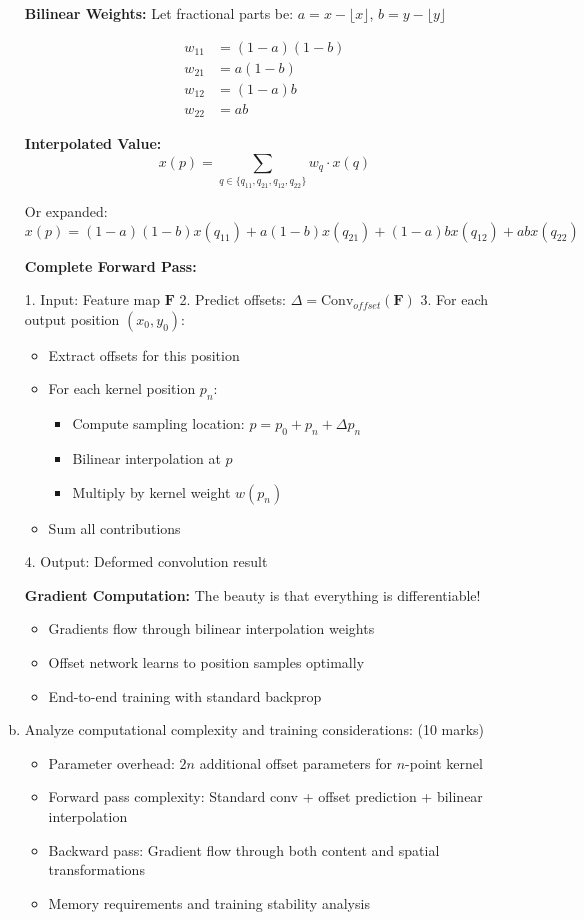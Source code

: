 \documentclass[12pt]{article}
\newcommand{\explanation}[1]{{\color{explanationcolor}#1}}
\begin{document}
\begin{enumerate}[(a)]
{{    \textbf{Bilinear Weights:}
    Let fractional parts be: $a = x - \lfloor x \rfloor$, $b = y - \lfloor y \rfloor$
    
    \begin{align}
    w_{11} &= (1-a)(1-b)\\
    w_{21} &= a(1-b)\\
    w_{12} &= (1-a)b\\
    w_{22} &= ab
    \end{align}
    
    \textbf{Interpolated Value:}
    \[x(p) = \sum_{q \in \{q_{11}, q_{21}, q_{12}, q_{22}\}} w_q \cdot x(q)\]
    
    Or expanded:
    \[x(p) = (1-a)(1-b)x(q_{11}) + a(1-b)x(q_{21}) + (1-a)bx(q_{12}) + abx(q_{22})\]
    }
    
    \textbf{Complete Forward Pass:}
    
    \explanation{
    1. Input: Feature map $\mathbf{F}$
    2. Predict offsets: $\Delta = \text{Conv}_{offset}(\mathbf{F})$
    3. For each output position $(x_0, y_0)$:
       \begin{itemize}
       \item Extract offsets for this position
       \item For each kernel position $p_n$:
         \begin{itemize}
         \item Compute sampling location: $p = p_0 + p_n + \Delta p_n$
         \item Bilinear interpolation at $p$
         \item Multiply by kernel weight $w(p_n)$
         \end{itemize}
       \item Sum all contributions
       \end{itemize}
    4. Output: Deformed convolution result
    
    \textbf{Gradient Computation:}
    The beauty is that everything is differentiable!
    \begin{itemize}
        \item Gradients flow through bilinear interpolation weights
        \item Offset network learns to position samples optimally
        \item End-to-end training with standard backprop
    \end{itemize}
    }
    }
    
    \item Analyze computational complexity and training considerations: \hfill (10 marks)
    \begin{itemize}
        \item Parameter overhead: $2n$ additional offset parameters for $n$-point kernel
        \item Forward pass complexity: Standard conv + offset prediction + bilinear interpolation
        \item Backward pass: Gradient flow through both content and spatial transformations
        \item Memory requirements and training stability analysis
    \end{itemize}
    

\end{enumerate}
\end{document}
